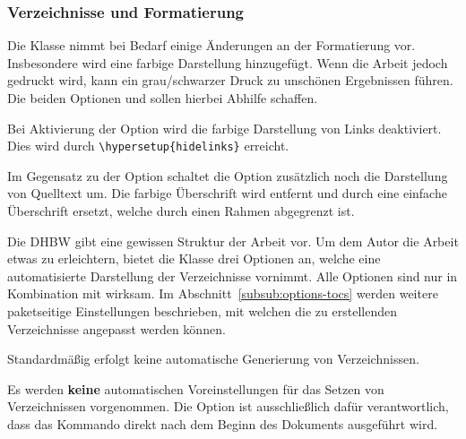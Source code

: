 \documentclass[babel=ngerman,highlight=false]{skdoc}
\begin{document}
            \subsubsection{Verzeichnisse und Formatierung}\label{subsub:format}
                Die Klasse nimmt bei Bedarf einige Änderungen an der Formatierung vor. Insbesondere wird eine farbige Darstellung hinzugefügt. Wenn die Arbeit jedoch gedruckt wird, kann ein grau/schwarzer Druck zu unschönen Ergebnissen führen. Die beiden Optionen  und  sollen hierbei Abhilfe schaffen.

                Bei Aktivierung der Option wird die farbige Darstellung von Links deaktiviert. Dies wird durch \verb|\hypersetup{hidelinks}| erreicht.\medskip

                Im Gegensatz zu der Option  schaltet die Option zusätzlich noch die Darstellung von Quelltext um. Die farbige Überschrift wird entfernt und durch eine einfache Überschrift ersetzt, welche durch einen Rahmen abgegrenzt ist.\bigskip

                Die DHBW gibt eine gewissen Struktur der Arbeit vor. Um dem Autor die Arbeit etwas zu erleichtern, bietet die Klasse drei Optionen an, welche eine automatisierte Darstellung der Verzeichnisse vornimmt. Alle Optionen sind nur in Kombination mit  wirksam. Im Abschnitt~\ref{subsub:options-tocs} werden weitere paketseitige Einstellungen beschrieben, mit welchen die zu erstellenden Verzeichnisse angepasst werden können.\medskip

                Standardmäßig erfolgt keine automatische Generierung von Verzeichnissen.

                Es werden \textbf{keine} automatischen Voreinstellungen für das Setzen von Verzeichnissen vorgenommen. Die Option ist ausschließlich dafür verantwortlich, dass das Kommando \Macro\dhbwprintintro direkt nach dem Beginn des Dokuments ausgeführt wird.\medskip
\end{document}
